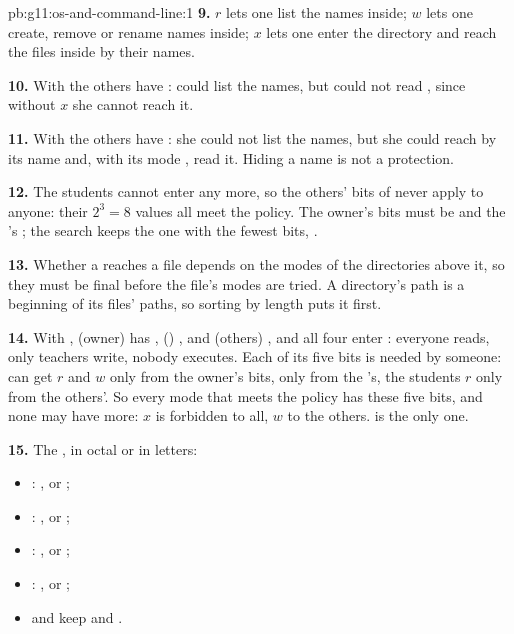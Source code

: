 \begin{solution}{pb:g11:os-and-command-line:1}
\textbf{9.} $r$ lets one list the names inside; $w$ lets one create, remove or rename names inside; $x$ lets one enter
the directory and reach the files inside by their names.

\textbf{10.} With  the others have :  could list the names, but could not read
, since without $x$ she cannot reach it.

\textbf{11.} With  the others have : she could not list the names, but she could reach
 by its name and, with its mode , read it. Hiding a name is not a protection.

\textbf{12.} The students cannot enter  any more, so the others' bits of  never apply
to anyone: their $2^3 = 8$ values all meet the policy. The owner's bits must be  and the 's
; the search keeps the one with the fewest bits, .

\textbf{13.} Whether a  reaches a file depends on the modes of the directories above it, so they must be final
before the file's modes are tried. A directory's path is a beginning of its files' paths, so sorting by length puts it
first.

\textbf{14.} With ,  (owner) has ,  () ,  and
 (others) , and all four enter : everyone reads, only teachers write, nobody
executes. Each of its five bits is needed by someone:  can get $r$ and $w$ only from the owner's bits,
 only from the 's, the students $r$ only from the others'. So every mode that meets the policy has
these five bits, and none may have more: $x$ is forbidden to all, $w$ to the others.  is the only one.

\textbf{15.} The , in octal or in letters:
\begin{itemize}
  \item {}: , or ;
  \item {}: , or ;
  \item {}: , or ;
  \item {}: , or ;
  \item {} and  keep  and .
\end{itemize}


\end{solution}
